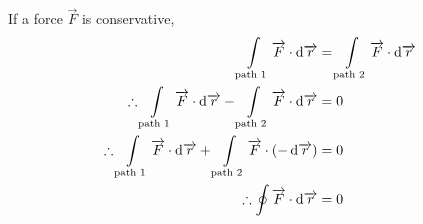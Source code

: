 \documentclass[fleqn]{article}
\theoremstyle{definition}
\theoremstyle{theorem}
\begin{document}
If a force $\overrightarrow{F}$ is conservative, 
\begin{align*}
	\int\displaylimits_{\text{path 1}} \overrightarrow{F} \cdot \dif \overrightarrow{r} &= \int\displaylimits_{\text{path 2}} \overrightarrow{F} \cdot \dif \overrightarrow{r} \\
	\therefore 	\int\displaylimits_{\text{path 1}} \overrightarrow{F} \cdot \dif \overrightarrow{r} - \int\displaylimits_{\text{path 2}} \overrightarrow{F} \cdot \dif \overrightarrow{r} &= 0 \\
	\therefore 	\int\displaylimits_{\text{path 1}} \overrightarrow{F} \cdot \dif \overrightarrow{r} + \int\displaylimits_{\text{path 2}} \overrightarrow{F} \cdot ( - \dif \overrightarrow{r}) &= 0 \\
	\therefore \oint \overrightarrow{F} \cdot \dif \overrightarrow{r} &= 0
\end{align*}
\end{document}
